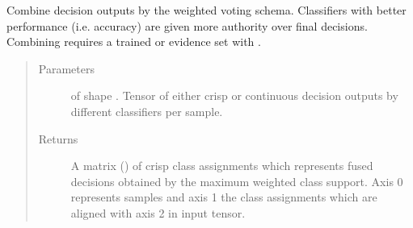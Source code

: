 \documentclass[letterpaper,10pt,english]{sphinxmanual}
\begin{document}
\begin{fulllineitems}
\begin{fulllineitems}
\label{\detokenize{pusion.core.weighted_voting_combiner:pusion.core.weighted_voting_combiner.WeightedVotingCombiner.combine}}
\sphinxAtStartPar
Combine decision outputs by the weighted voting schema.
Classifiers with better performance (i.e. accuracy) are given more authority over final decisions.
Combining requires a trained {\hyperref[\detokenize{pusion.core.weighted_voting_combiner:pusion.core.weighted_voting_combiner.WeightedVotingCombiner}]{}} or evidence set with .
\begin{quote}\begin{description}
\item[{Parameters}] \leavevmode
\sphinxAtStartPar
{} \textendash{}  of shape .
Tensor of either crisp or continuous decision outputs by different classifiers per sample.

\item[{Returns}] \leavevmode
\sphinxAtStartPar
A matrix () of crisp class assignments which represents fused
decisions obtained by the maximum weighted class support. Axis 0 represents samples and axis 1 the class
assignments which are aligned with axis 2 in  input tensor.

\end{description}\end{quote}

\end{fulllineitems}


\end{fulllineitems}

\end{document}
